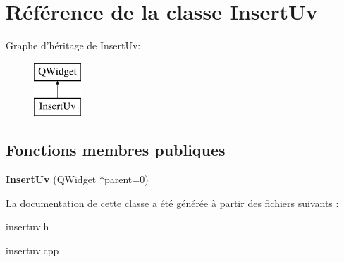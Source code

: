 \hypertarget{class_insert_uv}{\section{Référence de la classe Insert\+Uv}
\label{class_insert_uv}
}
Graphe d'héritage de Insert\+Uv\+:\begin{figure}[H]
\begin{center}
\leavevmode
\includegraphics[height=2.000000cm]{class_insert_uv}
\end{center}
\end{figure}
\subsection*{Fonctions membres publiques}
\begin{DoxyCompactItemize}
\item 
\hypertarget{class_insert_uv_aa3b48991cf4a591a2f9c76411800b26b}{{\bfseries Insert\+Uv} (Q\+Widget $\ast$parent=0)}\label{class_insert_uv_aa3b48991cf4a591a2f9c76411800b26b}

\end{DoxyCompactItemize}


La documentation de cette classe a été générée à partir des fichiers suivants \+:\begin{DoxyCompactItemize}
\item 
insertuv.\+h\item 
insertuv.\+cpp\end{DoxyCompactItemize}
